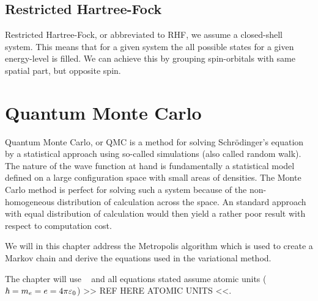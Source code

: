     \subsection{Restricted Hartree-Fock}
        Restricted Hartree-Fock, or abbreviated to RHF, we assume a
        closed-shell system. This means that for a given system the all
        possible states for a given energy-level is filled. We can achieve this
        by grouping spin-orbitals with same spatial part, but opposite spin.

\section{Quantum Monte Carlo\label{sec:QMC}}
    Quantum Monte Carlo, or QMC is a method for solving Schrödinger's equation
    by a statistical approach using so-called  simulations
    (also called random walk). The nature of the wave function at hand is
    fundamentally a statistical model defined on a large configuration space
    with small areas of densities. The Monte Carlo method is perfect for
    solving such a system because of the non-homogeneous distribution of
    calculation across the space. An standard approach with equal distribution
    of calculation would then yield a rather poor result with respect to
    computation cost.

    We will in this chapter address the Metropolis algorithm which is used to
    create a Markov chain and derive the equations used in the variational
    method.

    The chapter will use  ~\cite{GriffQuan} and all
    equations stated assume atomic units ($\hbar=m_e=e=4\pi\varepsilon_0$) >> REF
    HERE ATOMIC UNITS <<.

